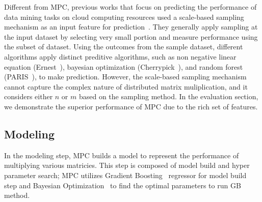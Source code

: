 \documentclass[10pt, conference, compsocconf]{IEEEtran}
\begin{document}
Different from MPC, previous works that focus on predicting the performance of data mining tasks on cloud computing resources used a scale-based sampling mechanism as an input feature for prediction~\cite{ernest, cherrypick, paris}. They generally apply sampling at the input dataset by selecting very small portion and measure performance using the subset of dataset. Using the outcomes from the sample dataset, different algorithms apply distinct preditive algorithms, such as non negative linear equation (Ernest~\cite{ernest}), bayesian optimization (Cherrypick~\cite{cherrypick}), and random forest (PARIS~\cite{paris}), to make prediction. However, the scale-based sampling mechanism cannot capture the complex nature of distributed matrix muliplication, and it considers either $n$ or $m$ based on the sampling method. In the evaluation section, we demonstrate the superior performance of MPC due to the rich set of features.

\subsection{Modeling}
In the modeling step, MPC builds a model to represent the performance of multiplying various matricies. This step is composed of model build and hyper parameter search; MPC utilizes Gradient Boosting~\cite{gradient-boosting} regressor for model build step and Bayesian Optimization~\cite{bayesian-optimization} to find the optimal parameters to run GB method.




\end{document}
